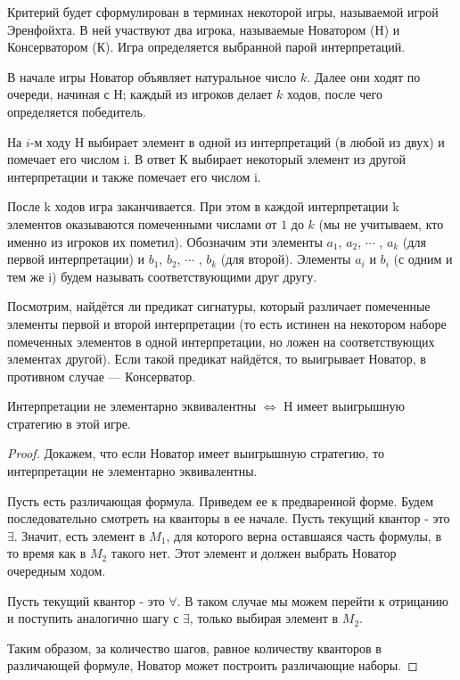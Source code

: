 \documentclass{article}
\begin{document}
Критерий будет сформулирован в терминах некоторой игры, называемой игрой Эренфойхта. В ней участвуют два игрока, называемые Новатором (Н) и Консерватором (К). Игра определяется выбранной парой интерпретаций.

В начале игры Новатор объявляет натуральное число $k$. Далее
они ходят по очереди, начиная с Н; каждый из игроков делает $k$ ходов, после чего определяется победитель.

На $i$-м ходу Н выбирает элемент в одной из интерпретаций (в
любой из двух) и помечает его числом i. В ответ К выбирает некоторый элемент из другой интерпретации и также помечает его числом i.

После k ходов игра заканчивается. При этом в каждой интерпретации k элементов оказываются помеченными числами от $1$ до $k$ (мы не учитываем, кто именно из игроков их пометил). Обозначим эти элементы
$a_1$, $a_2$, $\cdots$ , $a_k$ (для первой интерпретации)
и $b_1$, $b_2$, $\cdots$ , $b_k$ (для второй). Элементы $a_i$ и $b_i$ (с одним и тем же i) будем называть соответствующими друг другу.

Посмотрим, найдётся ли предикат сигнатуры, который различает помеченные элементы первой и второй интерпретации (то есть истинен на некотором наборе помеченных элементов в одной интерпретации, но ложен на соответствующих элементах другой). Если такой предикат найдётся, то выигрывает Новатор, в противном случае — Консерватор.

\begin{theorem}
Интерпретации не элементарно эквивалентны $\Longleftrightarrow$ Н имеет выигрышную стратегию в этой игре.
\end{theorem}

\begin{proof}

Докажем, что если Новатор имеет выигрышную стратегию, то интерпретации не элементарно эквивалентны.

Пусть есть различающая формула. Приведем ее к предваренной форме. Будем последовательно смотреть на кванторы в ее начале. Пусть текущий квантор - это $\exists$. Значит, есть элемент в $M_1$, для которого верна оставшаяся часть формулы, в то время как в $M_2$ такого нет. Этот элемент и должен выбрать Новатор очередным ходом.

Пусть текущий квантор - это $\forall$. В таком случае мы можем перейти к отрицанию и поступить аналогично шагу с $\exists$, только выбирая элемент в $M_2$.

Таким образом, за количество шагов, равное количеству кванторов в различающей формуле, Новатор может построить различающие наборы.

\end{proof}
\end{document}
